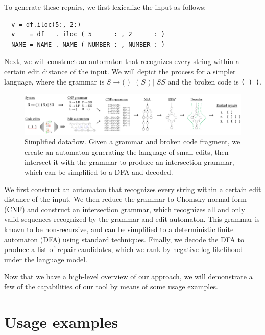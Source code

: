 \documentclass[runningheads]{llncs}
\begin{document}
\noindent To generate these repairs, we first lexicalize the input as follows:

\begin{verbatim}
  v = df.iloc(5:, 2:)
  v    = df   . iloc ( 5      : , 2      : )
  NAME = NAME . NAME ( NUMBER : , NUMBER : )
\end{verbatim}

\noindent Next, we will construct an automaton that recognizes every string within a certain edit distance of the input. We will depict the process for a simpler language, where the grammar is $S \rightarrow \texttt{( )} \mid \texttt{( } S \texttt{ )} \mid S S$ and the broken code is \texttt{( ) )}.\vspace{-0.3cm}

\begin{figure}[h!]
  \includegraphics[width=\textwidth]{flow.pdf}\vspace{-1pt}
  \caption{Simplified dataflow. Given a grammar and broken code fragment, we create an automaton generating the language of small edits, then intersect it with the grammar to produce an intersection grammar, which can be simplified to a DFA and decoded.}\label{fig:arch_simp}
\end{figure}\vspace{-0.3cm}

We first construct an automaton that recognizes every string within a certain edit distance of the input. We then reduce the grammar to Chomsky normal form (CNF) and construct an intersection grammar, which recognizes all and only valid sequences recognized by the grammar and edit automaton. This grammar is known to be non-recursive, and can be simplified to a deterministic finite automaton (DFA) using standard techniques. Finally, we decode the DFA to produce a list of repair candidates, which we rank by negative log likelihood under the language model.

Now that we have a high-level overview of our approach, we will demonstrate a few of the capabilities of our tool by means of some usage examples.

\section{Usage examples}
\end{document}
